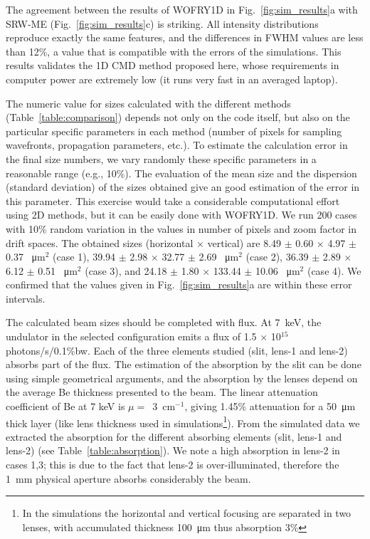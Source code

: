 \documentclass{iucr}              %
\begin{document}
The agreement between the results of WOFRY1D in Fig.~\ref{fig:sim_results}a with SRW-ME (Fig.~\ref{fig:sim_results}c) is striking. All intensity distributions reproduce exactly the same features, and the differences in FWHM values are less than 12\%, a value that is compatible with the errors of the simulations. 
This results validates the 1D CMD method proposed here, whose requirements in computer power are extremely low (it runs very fast in an averaged laptop). 

The numeric value for sizes calculated with the different methods (Table~\ref{table:comparison}) depends not only on the code itself, but also on the particular specific parameters in each method (number of pixels for sampling wavefronts, propagation parameters, etc.). To estimate the calculation error in the final size numbers, we vary randomly these specific parameters in a reasonable range (e.g., 10\%). The evaluation of the mean size and the dispersion (standard deviation) of the sizes obtained give an good estimation of the error in this parameter. This exercise would take a considerable computational effort using 2D methods, but it can be easily done with WOFRY1D. We run 200 cases with 10\% random variation in the values in number of pixels and zoom factor in drift spaces. The obtained sizes (horizontal $\times$ vertical) are  
8.49 $\pm$ 0.60 $\times$ 4.97 $\pm$ 0.37 \SI{}{\micro\meter}$^2$ (case 1),
39.94 $\pm$ 2.98 $\times$ 32.77 $\pm$ 2.69 \SI{}{\micro\meter}$^2$ (case 2),
36.39 $\pm$ 2.89 $\times$ 6.12 $\pm$ 0.51 \SI{}{\micro\meter}$^2$ (case 3), and
24.18 $\pm$ 1.80 $\times$ 133.44 $\pm$ 10.06 \SI{}{\micro\meter}$^2$ (case 4). We confirmed that the values given in Fig.~\ref{fig:sim_results}a are within these error intervals.

The calculated beam sizes should be completed with flux. At \SI{7}{keV}, the undulator in the selected configuration emits a flux of 1.5 $\times$ 10$^{15}$ photons/s/0.1\%bw. Each of the three elements studied (slit, lens-1 and lens-2) absorbs part of the flux. The estimation of the absorption by the slit can be done using simple geometrical arguments, and the absorption by the lenses depend on the average Be thickness presented to the beam. The linear attenuation coefficient of Be at 7 keV is $\mu=$~\SI{3}{\centi\meter}$^{-1}$, giving 1.45\% attenuation for a \SI{50}{\micro\meter} thick layer (like lens thickness used in simulations\footnote{In the simulations the horizontal and vertical focusing are separated in two lenses, with accumulated thickness \SI{100}{\micro\meter} thus absorption 3\%}). 
From the simulated data we extracted the absorption for the different absorbing elements (slit, lens-1 and lens-2) (see Table~\ref{table:absorption}).
We note a high absorption in lens-2 in cases 1,3; this is due to the fact that lens-2 is over-illuminated, therefore the \SI{1}{\milli\meter} physical aperture absorbs considerably the beam.
\end{document}
